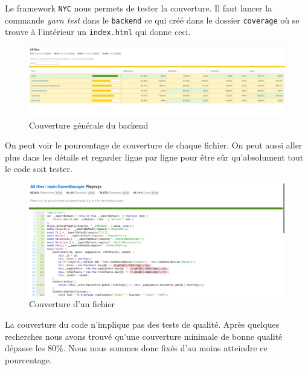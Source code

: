 Le framework \lstinline{NYC} nous permets de tester la couverture. Il faut lancer la commande \emph{yarn test} dans le \lstinline{backend} ce qui créé dans le dossier \lstinline{coverage} où se trouve à l'intérieur un \lstinline{index.html} qui donne ceci.

\begin{figure}[H]
    \centering
    \includegraphics[scale=0.35]{data/couverture_test_1.jpg}
    \caption{Couverture générale du backend}
\end{figure}

On peut voir le pourcentage de couverture de chaque fichier. On peut aussi aller plus dans les détails et regarder ligne par ligne pour être sûr qu'absolument tout le code soit tester.

\begin{figure}[H]
    \centering
    \includegraphics[scale=0.3]{data/couverture_test_2.png}
    \caption{Couverture d'un fichier}
\end{figure}

La couverture du code n'implique pas des tests de qualité. Après quelques recherches nous avons trouvé qu'une couverture minimale de bonne qualité dépasse les 80\%. Nous nous sommes donc fixés d'au moins atteindre ce pourcentage.